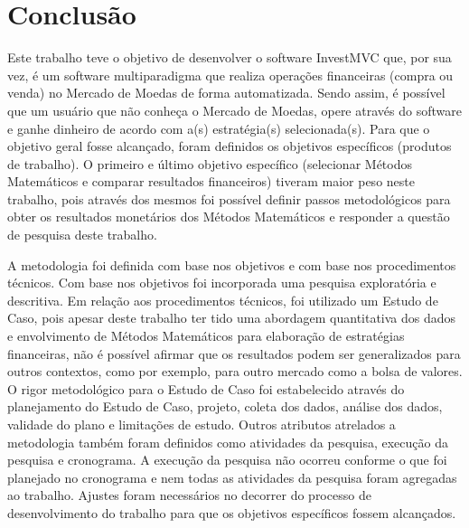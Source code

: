 \chapter{Conclusão}
\label{sec:conclusao}

Este trabalho teve o objetivo de desenvolver o software InvestMVC que, por sua vez, é um software multiparadigma que realiza operações financeiras (compra ou venda) no Mercado de Moedas de forma automatizada. Sendo assim, é possível que um usuário que não conheça o Mercado de Moedas, opere através do software e ganhe dinheiro de acordo com a(s) estratégia(s) selecionada(s). Para que o objetivo geral fosse alcançado, foram definidos os objetivos específicos (produtos de trabalho). O primeiro e último objetivo específico (selecionar Métodos Matemáticos e comparar resultados financeiros) tiveram maior peso neste trabalho, pois através dos mesmos foi possível definir passos metodológicos para obter os resultados monetários dos Métodos Matemáticos e responder a questão de pesquisa deste trabalho.

A metodologia foi definida com base nos objetivos e com base nos procedimentos técnicos. Com base nos objetivos foi incorporada uma pesquisa exploratória e descritiva. Em relação aos procedimentos técnicos, foi utilizado um Estudo de Caso, pois apesar deste trabalho ter tido uma abordagem quantitativa dos dados e envolvimento de Métodos Matemáticos para elaboração de estratégias financeiras, não é possível afirmar que os resultados podem ser generalizados para outros contextos, como por exemplo, para outro mercado como a bolsa de valores. O rigor metodológico para o Estudo de Caso foi estabelecido através do planejamento do Estudo de Caso, projeto, coleta dos dados, análise dos dados, validade do plano e limitações de estudo. Outros atributos atrelados a metodologia também foram definidos como atividades da pesquisa, execução da pesquisa e cronograma. A execução da pesquisa não ocorreu conforme o que foi planejado no cronograma e nem todas as atividades da pesquisa foram agregadas ao trabalho. Ajustes foram necessários no decorrer do processo de desenvolvimento do trabalho para que os objetivos específicos fossem alcançados.

